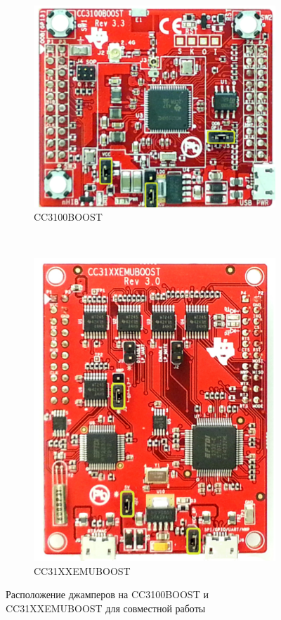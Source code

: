 \begin{figure}[!hbt]
    \begin{subfigure}{0.5\textwidth}
        \includegraphics[width=\textwidth]{figures/getstart-boost}
        \caption{CC3100BOOST}
        \label{fig13:a}
    \end{subfigure}
    ~
    \begin{subfigure}{0.5\textwidth}
        \includegraphics[width=\textwidth]{figures/getstart-emuboost}
        \caption{CC31XXEMUBOOST}
        \label{fig13:b}
    \end{subfigure}

    \caption{Расположение джамперов на CC3100BOOST и CC31XXEMUBOOST для совместной работы}
    \label{fig_13}
\end{figure}

